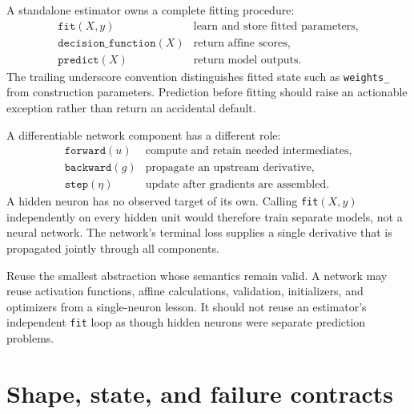 A standalone estimator owns a complete fitting procedure:
\[
\begin{array}{ll}
\texttt{fit}(X,y) & \text{learn and store fitted parameters},\\
\texttt{decision\_function}(X) & \text{return affine scores},\\
\texttt{predict}(X) & \text{return model outputs}.
\end{array}
\]
The trailing underscore convention distinguishes fitted state such as
\texttt{weights\_} from construction parameters. Prediction before fitting
should raise an actionable exception rather than return an accidental default.

A differentiable network component has a different role:
\[
\begin{array}{ll}
\texttt{forward}(u) & \text{compute and retain needed intermediates},\\
\texttt{backward}(g) & \text{propagate an upstream derivative},\\
\texttt{step}(\eta) & \text{update after gradients are assembled}.
\end{array}
\]
A hidden neuron has no observed target of its own. Calling
\texttt{fit}$(X,y)$ independently on every hidden unit would therefore train
separate models, not a neural network. The network's terminal loss supplies a
single derivative that is propagated jointly through all components.

\begin{professionalbox}
Reuse the smallest abstraction whose semantics remain valid. A network may
reuse activation functions, affine calculations, validation, initializers,
and optimizers from a single-neuron lesson. It should not reuse an estimator's
independent \texttt{fit} loop as though hidden neurons were separate prediction
problems.
\end{professionalbox}

\section{Shape, state, and failure contracts}


